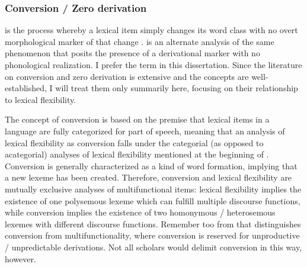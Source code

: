 \subsubsection{Conversion / Zero derivation}
\label{sec:2.3.1.7}

 is the process whereby a lexical item simply changes its word class with no overt morphological marker of that change \parencite[114]{Crystal2008}.  is an alternate analysis of the same phenomenon that posits the presence of a derivational marker with no phonological realization. I prefer the term  in this dissertation. Since the literature on conversion and zero derivation is extensive and the concepts are well-established, I will treat them only summarily here, focusing on their relationship to lexical flexibility.

The concept of conversion is based on the premise that lexical items in a language are fully categorized for part of speech, meaning that an analysis of lexical flexibility as conversion falls under the categorial (as opposed to acategorial) analyses of lexical flexibility mentioned at the beginning of . Conversion is generally characterized as a kind of word formation, implying that a new lexeme has been created. Therefore, conversion and lexical flexibility are mutually exclusive analyses of multifunctional items: lexical flexibility implies the existence of one polysemous lexeme which can fulfill multiple discourse functions, while conversion implies the existence of two homonymous / heterosemous lexemes with different discourse functions. Remember too from  that \textcite{Lier2012} distinguishes conversion from multifunctionality, where conversion is reserved for unproductive / unpredictable derivations. Not all scholars would delimit conversion in this way, however.

